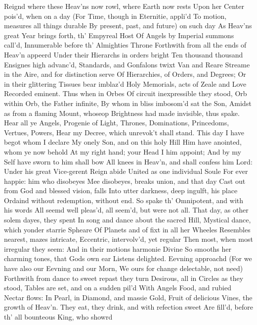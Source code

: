 \documentclass[11pt]{book}
\begin{document}
Reignd where these Heav'ns now rowl, where Earth now rests 
Upon her Center pois'd, when on a day 
(For Time, though in Eternitie, appli'd 
To motion, measures all things durable 
By present, past, and future) on such day 
As Heav'ns great Year brings forth, th' Empyreal Host 
Of Angels by Imperial summons call'd, 
Innumerable before th' Almighties Throne 
Forthwith from all the ends of Heav'n appeerd 
Under their Hierarchs in orders bright 
Ten thousand thousand Ensignes high advanc'd, 
Standards, and Gonfalons twixt Van and Reare 
Streame in the Aire, and for distinction serve 
Of Hierarchies, of Orders, and Degrees; 
Or in their glittering Tissues bear imblaz'd 
Holy Memorials, acts of Zeale and Love 
Recorded eminent.  Thus when in Orbes 
Of circuit inexpressible they stood, 
Orb within Orb, the Father infinite, 
By whom in bliss imbosom'd sat the Son, 
Amidst as from a flaming Mount, whoseop 
Brightness had made invisible, thus spake. 
\quad Hear all ye Angels, Progenie of Light, 
Thrones, Dominations, Princedoms, Vertues, Powers, 
Hear my Decree, which unrevok't shall stand. 
This day I have begot whom I declare 
My onely Son, and on this holy Hill 
Him have anointed, whom ye now behold 
At my right hand; your Head I him appoint; 
And by my Self have sworn to him shall bow 
All knees in Heav'n, and shall confess him Lord: 
Under his great Vice-gerent Reign abide 
United as one individual Soule 
For ever happie: him who disobeyes 
Mee disobeyes, breaks union, and that day 
Cast out from God and blessed vision, falls 
Into utter darkness, deep ingulft, his place 
Ordaind without redemption, without end. 
\quad So spake th' Omnipotent, and with his words 
All seemd well pleas'd, all seem'd, but were not all. 
That day, as other solem dayes, they spent 
In song and dance about the sacred Hill, 
Mystical dance, which yonder starrie Spheare 
Of Planets and of fixt in all her Wheeles 
Resembles nearest, mazes intricate, 
Eccentric, intervolv'd, yet regular 
Then most, when most irregular they seem: 
And in their motions harmonie Divine 
So smooths her charming tones, that Gods own ear 
Listens delighted.  Eevning approachd 
(For we have also our Eevning and our Morn, 
We ours for change delectable, not need) 
Forthwith from dance to sweet repast they turn 
Desirous, all in Circles as they stood, 
Tables are set, and on a sudden pil'd 
With Angels Food, and rubied Nectar flows: 
In Pearl, in Diamond, and massie Gold, 
Fruit of delicious Vines, the growth of Heav'n. 
They eat, they drink, and with refection sweet 
Are fill'd, before th' all bounteous King, who showrd 
\end{document}
